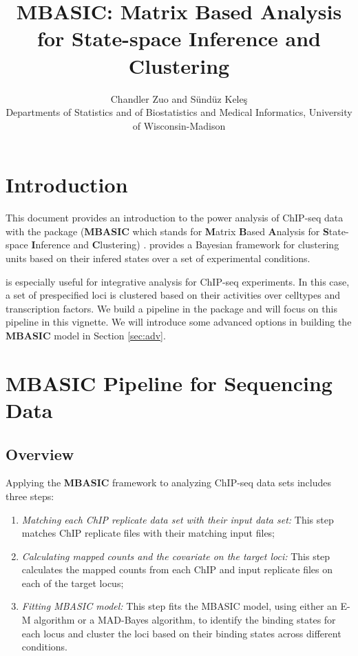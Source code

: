 \documentclass[a4paper,10pt]{article}\usepackage[]{graphicx}\usepackage[]{color}
\title{MBASIC: Matrix Based Analysis for State-space Inference and Clustering}
\author{Chandler Zuo and S\"und\"uz Kele\c{s}\\
  Departments of Statistics and of  Biostatistics and Medical Informatics, University of Wisconsin-Madison}
\date{}
\begin{document}
\maketitle

\tableofcontents

\section{Introduction}

This document provides an introduction to the power analysis of ChIP-seq data with the  package (\textbf{MBASIC} which stands for \textbf{M}atrix \textbf{B}ased \textbf{A}nalysis for \textbf{S}tate-space \textbf{I}nference and \textbf{C}lustering) \cite{zuo14}.  provides a Bayesian framework for clustering units based on their infered states over a set of experimental conditions.

 is especially useful for integrative analysis for ChIP-seq experiments. In this case, a set of prespecified loci is clustered based on their activities over celltypes and transcription factors. We build a pipeline in the  package and will focus on this pipeline in this vignette. We will introduce some advanced options in building the \textbf{MBASIC} model in Section \ref{sec:adv}.

\section{MBASIC Pipeline for Sequencing Data}

\subsection{Overview}

Applying the \textbf{MBASIC} framework to analyzing ChIP-seq data sets includes three steps:

\begin{enumerate}
\item \textit{Matching each ChIP replicate data set with their input data set:} This step matches ChIP replicate files with their matching input files;
\item \textit{Calculating mapped counts and the covariate on the target loci:} This step calculates the mapped counts from each ChIP and input replicate files on each of the target locus;
\item \textit{Fitting MBASIC model:} This step fits the MBASIC model, using either an E-M algorithm or a MAD-Bayes algorithm, to identify the binding states for each locus and cluster the loci based on their binding states across different conditions.
\end{enumerate}
\end{document}

